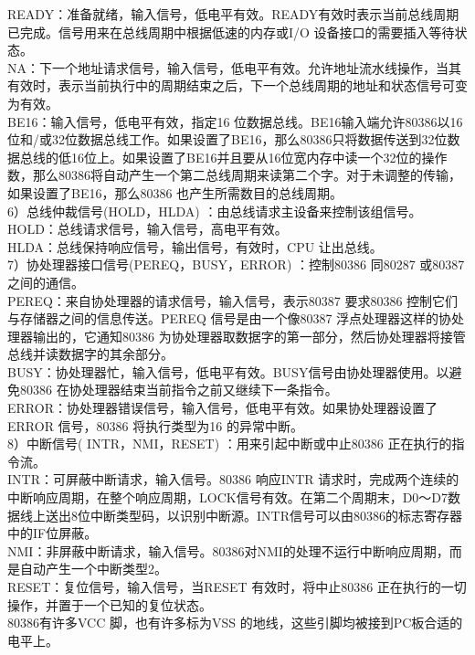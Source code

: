 \documentclass[12pt]{article}
\begin{document}
READY：准备就绪，输入信号，低电平有效。READY有效时表示当前总线周期已完成。信号用来在总线周期中根据低速的内存或I/O 设备接口的需要插入等待状态。\\
NA：下一个地址请求信号，输入信号，低电平有效。允许地址流水线操作，当其有效时，表示当前执行中的周期结束之后，下一个总线周期的地址和状态信号可变为有效。\\
BE16：输入信号，低电平有效，指定16 位数据总线。BE16输入端允许80386以16位和/或32位数据总线工作。如果设置了BE16，那么80386只将数据传送到32位数据总线的低16位上。如果设置了BE16并且要从16位宽内存中读一个32位的操作数，那么80386将自动产生一个第二总线周期来读第二个字。对于未调整的传输，如果设置了BE16，那么80386 也产生所需数目的总线周期。\\
6）总线仲裁信号(HOLD，HLDA) ：由总线请求主设备来控制该组信号。\\
HOLD：总线请求信号，输入信号，高电平有效。\\
HLDA：总线保持响应信号，输出信号，有效时，CPU 让出总线。\\
7）协处理器接口信号(PEREQ，BUSY，ERROR) ：控制80386 同80287 或80387 之间的通信。\\
PEREQ：来自协处理器的请求信号，输入信号，表示80387 要求80386 控制它们与存储器之间的信息传送。PEREQ 信号是由一个像80387 浮点处理器这样的协处理器输出的，它通知80386 为协处理器取数据字的第一部分，然后协处理器将接管总线并读数据字的其余部分。\\
BUSY：协处理器忙，输入信号，低电平有效。BUSY信号由协处理器使用。以避免80386 在协处理器结束当前指令之前又继续下一条指令。\\
ERROR：协处理器错误信号，输入信号，低电平有效。如果协处理器设置了ERROR 信号，80386 将执行类型为16 的异常中断。\\
8）中断信号( INTR，NMI，RESET) ：用来引起中断或中止80386 正在执行的指令流。\\
INTR：可屏蔽中断请求，输入信号。80386 响应INTR 请求时，完成两个连续的中断响应周期，在整个响应周期，LOCK信号有效。在第二个周期末，D0～D7数据线上送出8位中断类型码，以识别中断源。INTR信号可以由80386的标志寄存器中的IF位屏蔽。\\
NMI：非屏蔽中断请求，输入信号。80386对NMI的处理不运行中断响应周期，而是自动产生一个中断类型2。\\
RESET：复位信号，输入信号，当RESET 有效时，将中止80386 正在执行的一切操作，并置于一个已知的复位状态。\\
80386有许多VCC 脚，也有许多标为VSS 的地线，这些引脚均被接到PC板合适的电平上。
\end{document}

